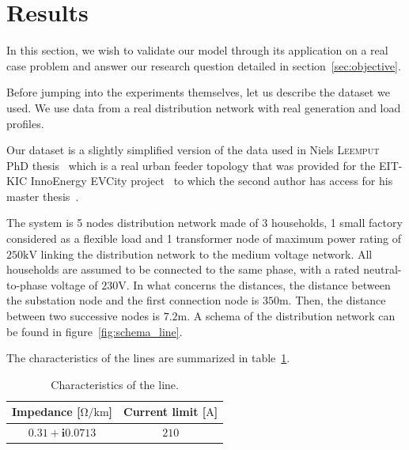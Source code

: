 \section{Results} %
\label{sec:results}

In this section, we wish to validate our model through its application on a real case problem and answer our research question detailed in section~\ref{sec:objective}.

Before jumping into the experiments themselves, let us describe the dataset we used.
We use data from a real distribution network with real generation and load profiles.

Our dataset is a slightly simplified version of the data used in Niels \textsc{Leemput} PhD thesis~\cite{Niels} which is a real urban feeder topology that was provided for the EIT-KIC InnoEnergy EVCity project~\cite{evcity} to which the second author has access for his master thesis~\cite{Quentin}.

The system is 5 nodes distribution network made of 3 households, 1 small factory considered as a flexible load and 1 transformer node of maximum power rating of $250\si{\kilo\volt}$ linking the distribution network to the medium voltage network.
All households are assumed to be connected to the same phase, with a rated neutral-to-phase voltage of $230\si{\volt}$.
In what concerns the distances, the distance between the substation node and the first connection node is $350\si{\meter}$.
Then, the distance between two successive nodes is $7.2\si{\meter}$.
A schema of the distribution network can be found in figure~\ref{fig:schema_line}.

The characteristics of the lines are summarized in table~\ref{tab:char_lines}.
\begin{table}[H]
  \caption{Characteristics of the line.}
  \label{tab:char_lines}
  \centering
  \begin{tabular}{c|c}
  \hline
   Impedance [$\si{\ohm\per\kilo\meter}$] & Current limit [$\si{\ampere}$] \\
   \hline
   $0.31 + \mathbf{i}0.0713$ & $210$ \\
   \hline
  \end{tabular}
\end{table}


